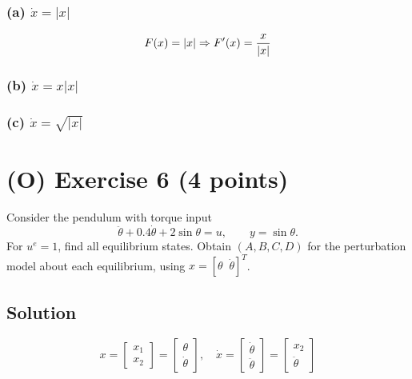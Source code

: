 \documentclass[12pt,a4paper]{article}
\begin{document}
\subsubsection*{(a) $\dot x = |x|$}

\[
F(x) = |x| \Rightarrow F'(x) = {x\over|x|}
\]


\vspace{1cm}
\subsubsection*{(b) $\dot x = x |x|$}


\vspace{1cm}
\subsubsection*{(c) $\dot x = \sqrt{|x|}$}

\vspace{1cm}






\vspace{3cm}
\vfill 
\clearpage
\section*{(O) Exercise 6 \hfill {\normalsize (4 points)}}
Consider the pendulum with torque input
\[
\ddot\theta+0.4\dot\theta+2\sin\theta=u,\qquad y=\sin\theta.
\]
For $u^e=1$, find all equilibrium states. Obtain $(A,B,C,D)$ for the perturbation model about each equilibrium, using $x=[\theta\;\;\dot\theta]^T$.
\subsection*{Solution}

\[
x = \begin{bmatrix}
	x_1 \\ x_2
\end{bmatrix} = 
 \begin{bmatrix}
	\theta \\ \dot \theta
\end{bmatrix},\quad \dot x = \begin{bmatrix}
\dot \theta \\ \ddot \theta
\end{bmatrix} = \begin{bmatrix}
x_2 \\ \ddot \theta
\end{bmatrix}
\]
\end{document}
